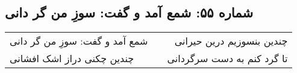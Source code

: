 \begin{center}
\section*{شماره ۵۵: شمع آمد و گفت: سوزِ من گر دانی}
\label{sec:055}
\begin{longtable}{l p{0.5cm} r}
شمع آمد و گفت: سوزِ من گر دانی
&&
چندین بنسوزیم درین حیرانی
\\
چندین چکنی دراز اشک افشانی
&&
تا گرد کنم به دست سرگردانی
\\
\end{longtable}
\end{center}
